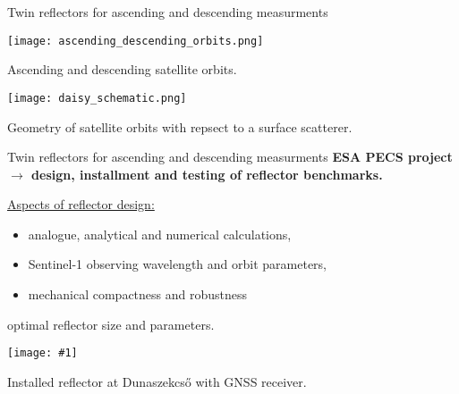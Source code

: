 \documentclass[aspectratio=169]{beamer}
\newcommand{\ffig}[1]{
    \begin{mdframed}[linecolor=red!50!black, linewidth=2pt, roundcorner=2.25pt,
                     innerrightmargin=0pt, innerleftmargin=0pt,
                     innertopmargin=0pt, innerbottommargin=0pt,
                     backgroundcolor=white, frametitle={}, align=center]
        \texttt{[image: \#1]}
    \end{mdframed}
}
\begin{document}
\begin{frame}{Twin reflectors for ascending and descending measurments}
    \begin{minipage}[c]{0.45\textwidth}
        \centering
        \texttt{[image: ascending\_descending\_orbits.png]}
        
        Ascending and descending satellite orbits.
    \end{minipage}
    \hspace{15pt}
    \pause
    \begin{minipage}[c]{0.45\textwidth}
        \centering
        \texttt{[image: daisy\_schematic.png]}
        
        Geometry of satellite orbits with repsect to a surface scatterer.
    \end{minipage}    
\end{frame}

\begin{frame}{Twin reflectors for ascending and descending measurments}
    \pause
    \textbf{ESA PECS project $\rightarrow$ design, installment and testing of reflector benchmarks.}
    \vspace{10pt}
    
    \begin{minipage}[c]{0.35\textwidth}
        \pause
        \underline{Aspects of reflector design:}
        \begin{itemize}
            \pause
            \item analogue, analytical and numerical calculations,
            \item Sentinel-1 observing wavelength and orbit parameters,
            \item mechanical compactness and robustness
        \end{itemize}
        \pause
        \begin{center}
            \resizebox{0.15\textwidth}{10pt}{$\Downarrow$}
            
            optimal reflector size and parameters.
        \end{center}
    \pause
    \end{minipage}
    \hspace{10pt}
    \begin{minipage}[c]{0.55\textwidth}
        \ffig{dszekcso_refl_2.jpg}
        Installed reflector at Dunaszekcső with GNSS receiver.
    \end{minipage}    
\end{frame}
\end{document}
